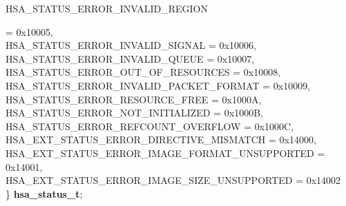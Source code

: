 \documentclass[final,oneside]{book}
\newcommand{\reftyp}[1]{#1}
\newcommand{\refenu}[1]{\reftyp{#1}}
\newenvironment{mylongtable}{\rowcolors{0}{lightgray}{lightgray}\longtable} {
\endlongtable}
\begin{document}
\begin{mylongtable}{@{}p{\textwidth}}
\hspace{1.7em}\hypertarget{group__status_1ggad755322e7ff95456520e8abdbe90d225ad63594ac02edec7ae7aa7722c11afcd9}{\refenu{HSA_\-STATUS_\-ERROR_\-INVALID_\-REGION}} = 0x10005,\\
\hspace{1.7em}\hypertarget{group__status_1ggad755322e7ff95456520e8abdbe90d225a7b4c8c0d4c99a1fe966abc2d39b575fe}{\refenu{HSA_\-STATUS_\-ERROR_\-INVALID_\-SIGNAL}} = 0x10006,\\
\hspace{1.7em}\hypertarget{group__status_1ggad755322e7ff95456520e8abdbe90d225aa3c762eb6a61b358702b45259d1686c4}{\refenu{HSA_\-STATUS_\-ERROR_\-INVALID_\-QUEUE}} = 0x10007,\\
\hspace{1.7em}\hypertarget{group__status_1ggad755322e7ff95456520e8abdbe90d225a1a77fcf36d0d140874c4361ab093eff7}{\refenu{HSA_\-STATUS_\-ERROR_\-OUT_\-OF_\-RESOURCES}} = 0x10008,\\
\hspace{1.7em}\hypertarget{group__status_1ggad755322e7ff95456520e8abdbe90d225a3fad45f72111eb99de5d8daef26c372c}{\refenu{HSA_\-STATUS_\-ERROR_\-INVALID_\-PACKET_\-FORMAT}} = 0x10009,\\
\hspace{1.7em}\hypertarget{group__status_1ggad755322e7ff95456520e8abdbe90d225a6406af88203fcbec4179fbb71cc66b65}{\refenu{HSA_\-STATUS_\-ERROR_\-RESOURCE_\-FREE}} = 0x1000A,\\
\hspace{1.7em}\hypertarget{group__status_1ggad755322e7ff95456520e8abdbe90d225a34ea59ade5bfce95eee935238a99f5b5}{\refenu{HSA_\-STATUS_\-ERROR_\-NOT_\-INITIALIZED}} = 0x1000B,\\
\hspace{1.7em}\hypertarget{group__status_1ggad755322e7ff95456520e8abdbe90d225aa9218eed04d1d2ffc5ed8f33f2cd1c9b}{\refenu{HSA_\-STATUS_\-ERROR_\-REFCOUNT_\-OVERFLOW}} = 0x1000C,\\
\hspace{1.7em}\hypertarget{group__status_1ggad755322e7ff95456520e8abdbe90d225ae16bcc443d027a0b880fd58f0443227b}{\refenu{HSA_\-EXT_\-STATUS_\-ERROR_\-DIRECTIVE_\-MISMATCH}} = 0x14000,\\
\hspace{1.7em}\hypertarget{group__status_1ggad755322e7ff95456520e8abdbe90d225a42108181943a2d94749d95dc7942b7d0}{\refenu{HSA_\-EXT_\-STATUS_\-ERROR_\-IMAGE_\-FORMAT_\-UNSUPPORTED}} = 0x14001,\\
\hspace{1.7em}\hypertarget{group__status_1ggad755322e7ff95456520e8abdbe90d225a3ff898da367040b1f382c14c9f0a1bab}{\refenu{HSA_\-EXT_\-STATUS_\-ERROR_\-IMAGE_\-SIZE_\-UNSUPPORTED}} = 0x14002\\
\} \hypertarget{group__status_1gad755322e7ff95456520e8abdbe90d225}{\textbf{hsa_\-status_\-t}};\rule[-2ex]{0pt}{0pt}\end{mylongtable}
\vspace{-5mm}
\end{document}
